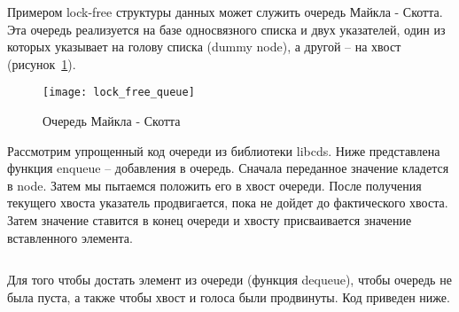 Примером lock-free структуры данных может служить очередь Майкла - Скотта. Эта очередь реализуется на базе односвязного списка и двух указателей, один из которых указывает на голову списка (dummy node), а другой -- на хвост (рисунок~\ref{lockFreeQueue:image}).

\begin{figure}[H]
    \texttt{[image: lock\_free\_queue]}
    \caption{Очередь Майкла - Скотта}
    \label{lockFreeQueue:image}
\end{figure}
	
Рассмотрим упрощенный код очереди из библиотеки libcds. Ниже представлена функция enqueue -- добавления в очередь. Сначала переданное значение кладется в node. Затем мы пытаемся положить его в хвост очереди. После получения текущего хвоста указатель продвигается, пока не дойдет до фактического хвоста. Затем значение ставится в конец очереди и хвосту присваивается значение вставленного элемента.

\inputminted{c++}{listings/lockFreeQueueEnqueue.cpp}
	
Для того чтобы достать элемент из очереди (функция dequeue), чтобы очередь не была пуста, а также чтобы хвост и голоса были продвинуты. Код приведен ниже.
\inputminted{c++}{listings/lockFreeQueueDequeue.cpp}

